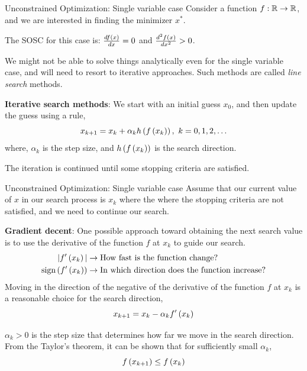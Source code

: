 \documentclass[aspectratio=169]{beamer}
\def\mb{\ensuremath\mathbb}
\def\lp{\ensuremath\left(}
\def\rp{\ensuremath\right)}
\def\R{\ensuremath\mb{R}}
\newcommand{\ct}[1]{\lp #1\rp}
\begin{document}
\begin{frame}{Unconstrained Optimization: Single variable case}
  Consider a function $f: \R \to \R$, and we are interested in finding the minimizer $x^*$.
  \vspace{0.25cm}

  The SOSC for this case is: $\frac{df\ct{x}}{dx} = 0$ and $\frac{d^2f\ct{x}}{dx^2} > 0$.
  \vspace{0.25cm}

  We might not be able to solve things analytically even for the single variable case, and will need to resort to iterative approaches. Such methods are called \textit{line search} methods.
  \vspace{0.25cm}

  \textbf{Iterative search methods}: We start with an initial guess $x_0$, and then update the guess using a rule,
  \[ x_{k+1} = x_k + \alpha_k h\ct{f\ct{x_k}}, \,\, k = 0, 1, 2, \ldots \]
  where, $\alpha_k$ is the step size, and $h\ct{f\ct{x_k}}$ is the search direction.
  \vspace{0.25cm}

  The iteration is continued until some stopping criteria are satisfied.
\end{frame}


\begin{frame}{Unconstrained Optimization: Single variable case}
  Assume that our current value of $x$ in our search process is $x_k$ where the  where the stopping criteria are not satisfied, and we need to continue our search.
  \vspace{0.25cm}

  \textbf{Gradient decent}: One possible approach toward obtaining the next search value is to use the derivative of the function $f$ at $x_k$ to guide our search. 
  \[ 
    \begin{split} 
    \vert f'\ct{x_k}\vert &\rightarrow \text{How fast is the function change?} \\
    \text{sign}\ct{f'\ct{x_k}} &\rightarrow \text{In which direction does the function increase?} \\
    \end{split}
  \]
  Moving in the direction of the negative of the derivative of the function $f$ at $x_k$ is a reasonable choice for the search direction,
  \[ x_{k+1} = x_k - \alpha_k f'\ct{x_k} \]

  $\alpha_k > 0$ is the step size that determines how far we move in the search direction. From the Taylor's theorem, it can be shown that for sufficiently small $\alpha_k$,
  \[ f\ct{x_{k+1}} \leq f\ct{x_{k}} \]
\end{frame}
\end{document}
